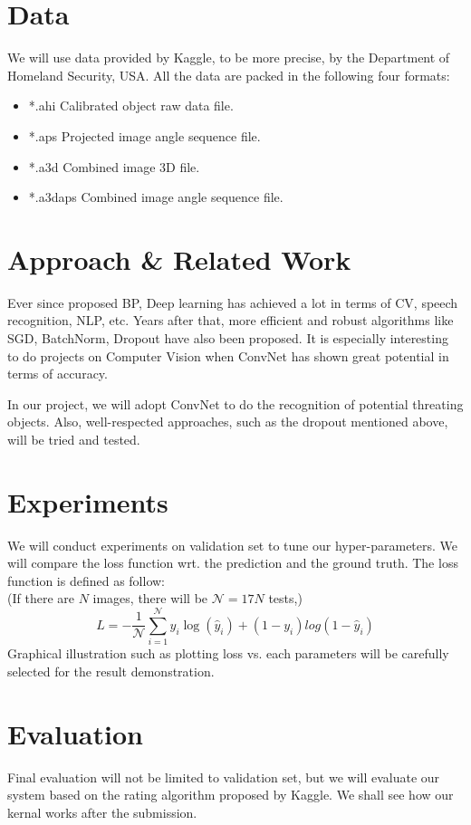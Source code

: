 \documentclass[conference,compsoc]{IEEEtran}
\begin{document}
\section{Data}
	We will use data provided by Kaggle, to be more precise, by the Department of Homeland Security, USA. All the data are packed in the following four formats:
	\begin{itemize}
		\item{*.ahi} Calibrated object raw data file.
		\item{*.aps} Projected image angle sequence file.
		\item{*.a3d} Combined image 3D file.
		\item{*.a3daps} Combined image angle sequence file.
	\end{itemize}
\section{Approach \& Related Work}
	\par
	Ever since \cite{hinton2006fast} proposed BP, Deep learning has achieved a lot in terms of CV, speech recognition, NLP, etc.
	Years after that, more efficient and robust algorithms like SGD\cite{bottou2010large, lecun2012efficient}, BatchNorm\cite{ioffe2015batch}, Dropout\cite{hinton2012improving, srivastava2014dropout} have also been proposed. It is especially interesting to do projects on Computer Vision when ConvNet\cite{krizhevsky2012imagenet} has shown great potential in terms of accuracy.
	\par
	In our project, we will adopt ConvNet to do the recognition of potential threating objects. Also, well-respected approaches, such as the dropout mentioned above, will be tried and tested.
\section{Experiments}
	We will conduct experiments on validation set to tune our hyper-parameters. We will compare the loss function wrt. the prediction and the ground truth. The loss function is defined as follow: \\
	(If there are $N$ images, there will be $\mathcal{N} = 17N$ tests,)
	$$ L = -\frac{1}{\mathcal{N}}\sum_{i=1}^\mathcal{N}{y_i\log(\hat{y}_i) + (1-y_i)log(1-\hat{y}_i)}$$
	Graphical illustration such as plotting loss vs. each parameters will be carefully selected for the result demonstration.
\section{Evaluation}
	Final evaluation will not be limited to validation set, but we will evaluate our system based on the rating algorithm proposed by Kaggle. We shall see how our kernal works after the submission.




\end{document}
